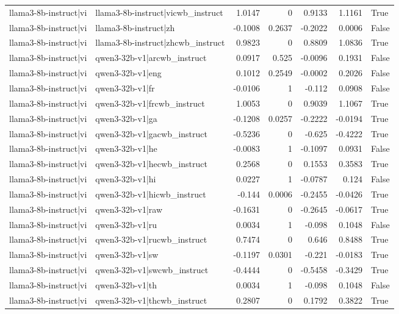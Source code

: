 \begin{table}
\begin{tabular}{l l r r r r l}
llama3-8b-instruct|vi & llama3-8b-instruct|vicwb_instruct & 1.0147 & 0 & 0.9133 & 1.1161 & True \\
llama3-8b-instruct|vi & llama3-8b-instruct|zh & -0.1008 & 0.2637 & -0.2022 & 0.0006 & False \\
llama3-8b-instruct|vi & llama3-8b-instruct|zhcwb_instruct & 0.9823 & 0 & 0.8809 & 1.0836 & True \\
llama3-8b-instruct|vi & qwen3-32b-v1|arcwb_instruct & 0.0917 & 0.525 & -0.0096 & 0.1931 & False \\
llama3-8b-instruct|vi & qwen3-32b-v1|eng & 0.1012 & 0.2549 & -0.0002 & 0.2026 & False \\
llama3-8b-instruct|vi & qwen3-32b-v1|fr & -0.0106 & 1 & -0.112 & 0.0908 & False \\
llama3-8b-instruct|vi & qwen3-32b-v1|frcwb_instruct & 1.0053 & 0 & 0.9039 & 1.1067 & True \\
llama3-8b-instruct|vi & qwen3-32b-v1|ga & -0.1208 & 0.0257 & -0.2222 & -0.0194 & True \\
llama3-8b-instruct|vi & qwen3-32b-v1|gacwb_instruct & -0.5236 & 0 & -0.625 & -0.4222 & True \\
llama3-8b-instruct|vi & qwen3-32b-v1|he & -0.0083 & 1 & -0.1097 & 0.0931 & False \\
llama3-8b-instruct|vi & qwen3-32b-v1|hecwb_instruct & 0.2568 & 0 & 0.1553 & 0.3583 & True \\
llama3-8b-instruct|vi & qwen3-32b-v1|hi & 0.0227 & 1 & -0.0787 & 0.124 & False \\
llama3-8b-instruct|vi & qwen3-32b-v1|hicwb_instruct & -0.144 & 0.0006 & -0.2455 & -0.0426 & True \\
llama3-8b-instruct|vi & qwen3-32b-v1|raw & -0.1631 & 0 & -0.2645 & -0.0617 & True \\
llama3-8b-instruct|vi & qwen3-32b-v1|ru & 0.0034 & 1 & -0.098 & 0.1048 & False \\
llama3-8b-instruct|vi & qwen3-32b-v1|rucwb_instruct & 0.7474 & 0 & 0.646 & 0.8488 & True \\
llama3-8b-instruct|vi & qwen3-32b-v1|sw & -0.1197 & 0.0301 & -0.221 & -0.0183 & True \\
llama3-8b-instruct|vi & qwen3-32b-v1|swcwb_instruct & -0.4444 & 0 & -0.5458 & -0.3429 & True \\
llama3-8b-instruct|vi & qwen3-32b-v1|th & 0.0034 & 1 & -0.098 & 0.1048 & False \\
llama3-8b-instruct|vi & qwen3-32b-v1|thcwb_instruct & 0.2807 & 0 & 0.1792 & 0.3822 & True \\

\end{tabular}
\end{table}
